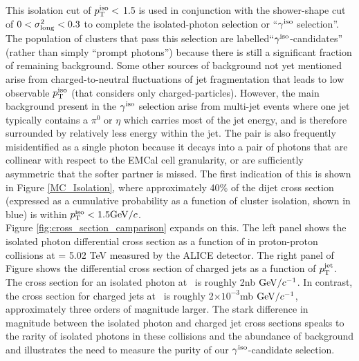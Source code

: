 This isolation cut of {$p_{\mathrm{T}}^\mathrm{iso}<$ 1.5 \GeVc} is used in conjunction with the shower-shape cut  of $0<\sigma^{2}_{\mathrm{long}}<0.3$ to complete the isolated-photon selection or ``$\gamma^\mathrm{iso}$ selection''. The population of clusters that pass this selection are labelled``$\gamma^\mathrm{iso}$-candidates'' (rather than simply ``prompt photons'') because there is still a significant fraction of remaining background. Some other sources of background not yet mentioned arise from charged-to-neutral fluctuations of jet fragmentation that leads to low observable $p_{\mathrm{T}}^\mathrm{iso}$ (that considers only charged-particles). However, the main background present in the $\gamma^\mathrm{iso}$ selection arise from multi-jet events where one jet typically contains a $\pi^{0}$ or $\eta$ which carries most of the jet energy, and is therefore surrounded by relatively less energy within the jet. The pair is also frequently misidentified as a single photon because it decays into a pair of photons that are collinear with respect to the EMCal cell granularity, or are sufficiently asymmetric that the softer partner is missed. The first indication of this is shown in Figure \ref{MC_Isolation}, where approximately 40\% of the dijet cross section (expressed as a cumulative probability as a function of cluster isolation, shown in blue) is within $p_{\mathrm{T}}^\mathrm{iso} < 1.5 \mathrm{GeV}/c$.\\ 

Figure \ref{fig:cross_section_camparison} expands on this. The left panel shows the isolated photon differential cross section as a function of \ptgamma in proton-proton collisions at \sqrts = 5.02 TeV measured by the ALICE detector. The right panel of Figure shows the differential cross section of charged jets as a function of $p_{\mathrm{T}}^\mathrm{jet}$. The cross section for an isolated photon at  \GeVc~is roughly 2nb $\mathrm{GeV}/c^{-1}$. In contrast, the cross section for charged jets at  \GeVc~is roughly 2$\times10^{-3}$mb $\mathrm{GeV}/c^{-1}$, approximately three orders of magnitude larger. The stark difference in magnitude between the isolated photon and charged jet cross sections speaks to the rarity of isolated photons in these collisions and the abundance of background and illustrates the need to measure the purity of our $\gamma^\mathrm{iso}$-candidate selection.%

